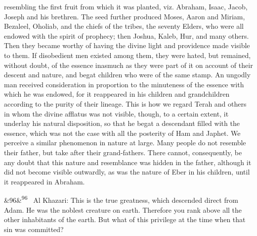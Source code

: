 \documentclass[12pt]{article}
\newcommand{\para}[1][]{\par\noindent\ifx&#1&\else\textsuperscript{\footnotesize #1}~\fi}
\begin{document}
resembling the first fruit from which it was planted, viz. Abraham, Isaac, Jacob, Joseph and his brethren. The seed further produced Moses, Aaron and Miriam, Bezaleel, Oholiab, and the chiefs of the tribes, the seventy Elders, who were all endowed with the spirit of prophecy; then Joshua, Kaleb, Hur, and many others. Then they became worthy of having the divine light and providence made visible to them. If disobedient men existed among them, they were hated, but remained, without doubt, of the essence inasmuch as they were part of it on account of their descent and nature, and begat children who were of the same stamp. An ungodly man received consideration in proportion to the minuteness of the essence with which he was endowed, for it reappeared in his children and grandchildren according to the purity of their lineage. This is how we regard Terah and others in whom the divine afflatus was not visible, though, to a certain extent, it underlay his natural disposition, so that he begat a descendant filled with the essence, which was not the case with all the posterity of Ham and Japhet. We perceive a similar phenomenon in nature at large. Many people do not resemble their father, but take after their grand-fathers. There cannot, consequently, be any doubt that this nature and resemblance was hidden in the father, although it did not become visible outwardly, as was the nature of Eber in his children, until it reappeared in Abraham.

\para[96] Al Khazari: This is the true greatness, which descended direct from Adam. He was the noblest creature on earth. Therefore you rank above all the other inhabitants of the earth. But what of this privilege at the time when that sin was committed?
\end{document}
